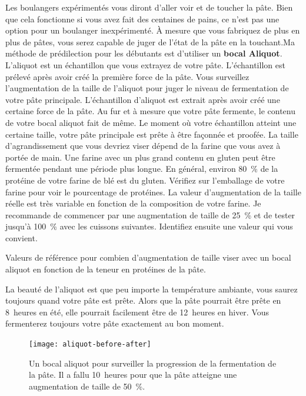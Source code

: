 Les boulangers expérimentés vous diront d'aller voir et de toucher la pâte. Bien que cela fonctionne si vous avez fait des centaines de pains, ce n'est pas une option pour un boulanger inexpérimenté. À mesure que vous fabriquez de plus en plus de pâtes, vous serez capable de juger de l'état de la pâte en la touchant.Ma méthode de prédilection pour les débutants est d'utiliser un \textbf{bocal Aliquot}.
L'aliquot est un échantillon que vous extrayez de votre pâte. L'échantillon est prélevé après avoir créé la première force de la pâte.
Vous surveillez l'augmentation de la taille de l'aliquot pour juger le niveau de fermentation de votre pâte principale. L'échantillon d'aliquot est extrait après avoir créé une certaine force de la pâte. Au fur et à mesure que votre pâte fermente, le contenu de votre bocal aliquot fait de même. Le moment où votre échantillon atteint une certaine taille, votre pâte principale est prête à être façonnée et proofée. La taille d'agrandissement que vous devriez viser dépend de la farine que vous avez à portée de main. Une farine avec un plus grand contenu en gluten peut être fermentée pendant une période plus longue. En général, environ \qty{80}{\percent} de la protéine de votre farine de blé est du gluten. Vérifiez sur l'emballage de votre farine pour voir le pourcentage de protéines. La valeur d'augmentation de la taille réelle est très variable en fonction de la composition de votre farine.
Je recommande de commencer par une augmentation de taille de \qty{25}{\percent} et de tester jusqu'à \qty{100}{\percent} avec les cuissons suivantes. Identifiez ensuite une valeur qui vous convient.

\begin{table}[!htb]
    \begin{center}
        
        \caption[Augmentation de la taille par rapport au contenu en protéines]{Valeurs de référence pour
            combien d'augmentation de taille viser avec un bocal aliquot en fonction de
            la teneur en protéines de la pâte.}
    \end{center}
\end{table}

La beauté de l'aliquot est que peu importe la température ambiante, vous saurez toujours quand votre pâte est prête.
Alors que la pâte pourrait être prête en 8~heures en été, elle pourrait facilement être de 12~heures en hiver. Vous fermenterez toujours votre pâte exactement au bon moment.


\begin{figure}[!htb]
  \texttt{[image: aliquot-before-after]}
  \caption[Bocal Aliquot]{Un bocal aliquot pour surveiller la progression de la fermentation de la pâte. Il a fallu 10~heures pour que la pâte atteigne une augmentation de taille de \qty{50}{\percent}.}
\end{figure}

